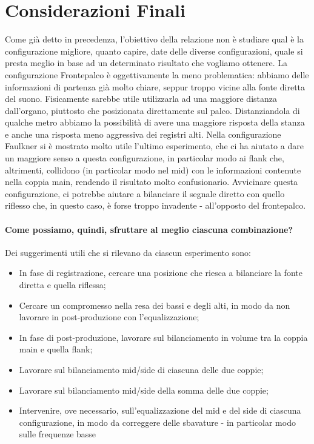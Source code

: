 \documentclass{article}
\begin{document}
\section{Considerazioni Finali}
    Come già detto in precedenza, l'obiettivo della relazione non è studiare qual è la configurazione migliore, quanto capire, date delle diverse configurazioni, quale si presta meglio in base ad un determinato risultato che vogliamo ottenere.
    La configurazione Frontepalco è oggettivamente la meno problematica: abbiamo delle informazioni di partenza già molto chiare, seppur troppo vicine alla fonte diretta del suono. Fisicamente sarebbe utile utilizzarla ad una maggiore distanza dall'organo, piuttosto che posizionata direttamente sul palco. Distanziandola di qualche metro abbiamo la possibilità di avere una maggiore risposta della stanza e anche una risposta meno aggressiva dei registri alti.
    Nella configurazione Faulkner si è mostrato molto utile l'ultimo esperimento, che ci ha aiutato a dare un maggiore senso a questa configurazione, in particolar modo ai flank che, altrimenti, collidono (in particolar modo nel mid) con le informazioni contenute nella coppia main, rendendo il risultato molto confusionario. Avvicinare questa configurazione, ci potrebbe aiutare a bilanciare il segnale diretto con quello riflesso che, in questo caso, è forse troppo invadente - all'opposto del frontepalco.
    \paragraph{Come possiamo, quindi, sfruttare al meglio ciascuna combinazione?} Dei suggerimenti utili che si rilevano da ciascun esperimento sono:
    \begin{itemize}
        \item In fase di registrazione, cercare una posizione che riesca a bilanciare la fonte diretta e quella riflessa;
        \item Cercare un compromesso nella resa dei bassi e degli alti, in modo da non lavorare in post-produzione con l'equalizzazione;
        \item In fase di post-produzione, lavorare sul bilanciamento in volume tra la coppia main e quella flank;
        \item Lavorare sul bilanciamento mid/side di ciascuna delle due coppie;
        \item Lavorare sul bilanciamento mid/side della somma delle due coppie;
        \item Intervenire, ove necessario, sull'equalizzazione del mid e del side di ciascuna configurazione, in modo da correggere delle sbavature - in particolar modo sulle frequenze basse
    \end{itemize}
\end{document}
